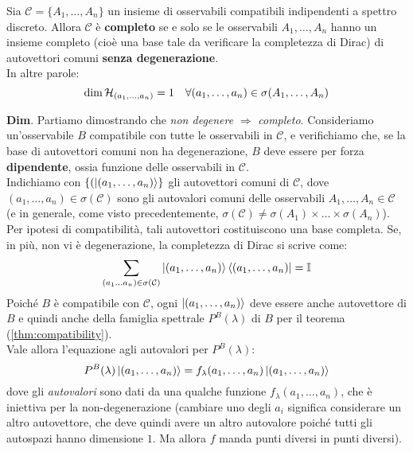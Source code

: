 \documentclass[../../FisicaTeorica.tex]{subfiles}
\begin{document}
\begin{thm}
Sia $\mathcal{C}=\{A_1, \dots, A_n\}$ un insieme di osservabili compatibili indipendenti a spettro discreto. Allora $\mathcal{C}$ è \textbf{completo} se e solo se le osservabili $A_1, \dots, A_n$ hanno un insieme completo (cioè una base tale da verificare la completezza di Dirac) di autovettori comuni \textbf{senza degenerazione}.\\
In altre parole:
\[
\dim \mathcal{H}_{(a_1,\dots,a_n)}=1\quad \forall (a_1,\dots,a_n)\in \sigma(A_1,\dots,A_n)
\]
\end{thm} 
\textbf{Dim}. Partiamo dimostrando che \textit{non degenere} $\Rightarrow$ \textit{completo}.         
Consideriamo un'osservabile $B$ compatibile con tutte le osservabili in $\mathcal{C}$, e verifichiamo che, se la base di autovettori comuni non ha degenerazione, $B$ deve essere per forza \textbf{dipendente}, ossia funzione delle osservabili in $\mathcal{C}$.\\
Indichiamo con $\{(\Ket{(a_1,\dots, a_n)}\}$ gli autovettori comuni di $\mathcal{C}$, dove $(a_1, \dots, a_n)\in\sigma(\mathcal{C})$ sono gli autovalori comuni delle osservabili $A_1, \dots, A_n \in \mathcal{C}$ (e in generale, come visto precedentemente, $\sigma(\mathcal{C})\neq \sigma(A_1)\times \dots \times \sigma(A_n)$).\\
Per ipotesi di compatibilità, tali autovettori costituiscono una base completa. Se, in più, non vi è degenerazione, la completezza di Dirac si scrive come:
\begin{equation}
\sum_{(a_1 \dots a_n)\in \sigma(\mathcal{C})} \Ket{(a_1, \dots, a_n)}\Bra{(a_1, \dots, a_n)}=\mathbb{I}
\label{eqn:completezza_base_comune}
\end{equation}
Poiché $B$ è compatibile con $\mathcal{C}$, ogni $\Ket{(a_1, \dots, a_n)}$ deve essere anche autovettore di $B$ e quindi anche della famiglia spettrale $P^B(\lambda)$  di $B$ per il teorema (\ref{thm:compatibility}).\\
Vale allora l'equazione agli autovalori per $P^B(\lambda)$:
\begin{equation}
P^B(\lambda)\Ket{(a_1, \dots, a_n)}=f_\lambda(a_1, \dots, a_n) \Ket{(a_1, \dots, a_n)}
\label{eqn:proiettori_base_comune}
\end{equation}
dove gli \textit{autovalori} sono dati da una qualche funzione $f_\lambda(a_1,\dots, a_n)$, che è iniettiva per la non-degenerazione (cambiare uno degli $a_i$ significa considerare un altro autovettore, che deve quindi avere un altro autovalore poiché tutti gli autospazi hanno dimensione $1$. Ma allora $f$ manda punti diversi in punti diversi).\\
\end{document}
